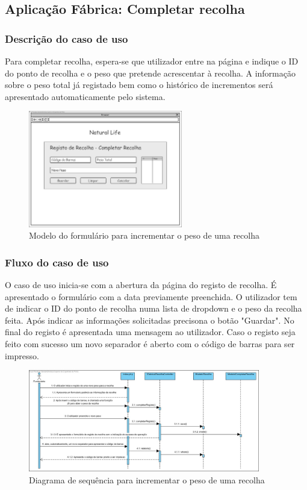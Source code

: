 \subsection{Aplicação Fábrica: Completar recolha}
\subsubsection*{Descrição do caso de uso}
Para completar recolha, espera-se que utilizador entre na página e indique o ID do ponto de recolha e o peso que pretende acrescentar à recolha. A informação sobre o peso total já registado bem como o histórico de incrementos será apresentado automaticamente pelo sistema. 

\begin{figure}[H] 
	\begin{center}
		\includegraphics[width=0.60\textwidth,keepaspectratio]{figuras/Diagramas_vp/DI_Fabrica_7_Completa_Recolha.jpg}
		\caption{Modelo do formulário para incrementar o peso de uma recolha}
		\label{fig:di_completar_recolha} 
	\end{center}
\end{figure}

\subsubsection*{Fluxo do caso de uso}
O caso de uso inicia-se com a abertura da página do registo de recolha. É apresentado o formulário com a data previamente preenchida. O utilizador tem de indicar o ID do ponto de recolha numa lista de dropdown e o peso da recolha feita. Após indicar as informações solicitadas precisona o botão "Guardar". No final do registo é apresentada uma mensagem ao utilizador. Caso o registo seja feito com sucesso um novo separador é aberto com o código de barras para ser impresso.


\begin{figure}[h!] 
	\begin{center}
		\includegraphics[width=0.90\textwidth,keepaspectratio]{figuras/Diagramas_vp/SD_Fabrica_7_Completar_Recolha.jpg}
		\caption{Diagrama de sequência para incrementar o peso de uma recolha}
		\label{fig:sd_completar_recolha} 
	\end{center}
\end{figure}